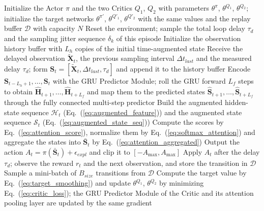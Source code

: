 \documentclass[review]{elsarticle}
\begin{document}
\begin{algorithm}[htbp]
\color{blue}
\makeatletter
\renewcommand{\fnum@algorithm}{\textcolor{blue}{\@nameuse{fname@algorithm}~\@nameuse{thealgorithm}}}
\makeatother
\caption{\textcolor{blue}{End-to-end training procedure of the GRUA-TD3 controller}}
\label{alg:grua_td3}
\begin{algorithmic}[1]
\State Initialize the Actor $\pi$ and the two Critics $Q_1$, $Q_2$ with parameters $\theta^{\pi}$, $\theta^{Q_1}$, $\theta^{Q_2}$; initialize the target networks $\theta^{\pi'}$, $\theta^{Q'_1}$, $\theta^{Q'_2}$ with the same values and the replay buffer $\mathcal{D}$ with capacity $N$
  \State Reset the environment; sample the total loop delay $\tau_{d}$ and the sampling jitter sequence $\delta_k$ of this episode
  \State Initialize the observation history buffer with $L_h$ copies of the initial time-augmented state
     \State Receive the delayed observation $\tilde{\mathbf{X}}_t$, the previous sampling interval $\Delta t_{last}$ and the measured delay $\tau_{d}$; form $\mathbf{S}_t=[\tilde{\mathbf{X}}_t,\Delta t_{last},\tau_{d}]$ and append it to the history buffer
     \State Encode $\mathbf{S}_{t-L_h+1},\dots,\mathbf{S}_t$ with the GRU Predictor Module; roll the GRU forward $L_f$ steps to obtain $\hat{\mathbf{H}}_{t+1},\dots,\hat{\mathbf{H}}_{t+L_f}$ and map them to the predicted states $\hat{\mathbf{S}}_{t+1},\dots,\hat{\mathbf{S}}_{t+L_f}$ through the fully connected multi-step predictor
     \State Build the augmented hidden-state sequence $\mathcal{H}_t$ (Eq.~(\ref{eq:augmented_feature})) and the augmented state sequence $\mathcal{S}_t$ (Eq.~(\ref{eq:augmented_state_seq}))
     \State Compute the scores by Eq.~(\ref{eq:attention_score}), normalize them by Eq.~(\ref{eq:softmax_attention}) and aggregate the states into $\bar{\mathbf{S}}_t$ by Eq.~(\ref{eq:attention_aggregated})
     \State Output the action $A_t=\pi(\bar{\mathbf{S}}_t)+\epsilon_{expl}$ and clip it to $[-A_{\max},A_{\max}]$
     \State Apply $A_t$ after the delay $\tau_{d}$; observe the reward $r_t$ and the next observation, and store the transition in $\mathcal{D}$
     \State Sample a mini-batch of $B_{size}$ transitions from $\mathcal{D}$
     \State Compute the target value by Eq.~(\ref{eq:target_smoothing}) and update $\theta^{Q_1}$, $\theta^{Q_2}$ by minimizing Eq.~(\ref{eq:critic_loss}); the GRU Predictor Module of the Critic and its attention pooling layer are updated by the same gradient

\end{algorithmic}
\end{algorithm}
\end{document}
